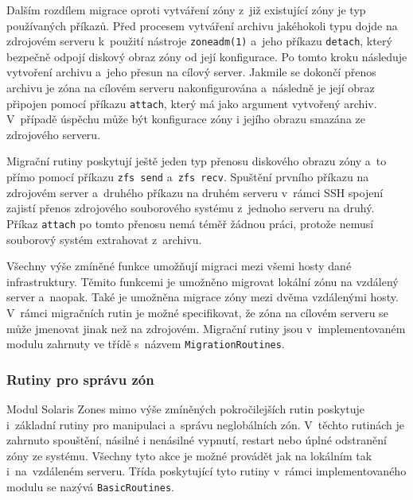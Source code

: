 Dalším rozdílem migrace oproti vytváření zóny z~již existující zóny je typ používaných příkazů. Před procesem vytváření archivu
jakéhokoli typu dojde na zdrojovém serveru
k~použití nástroje \verb|zoneadm(1)| a~jeho příkazu \verb|detach|, který bezpečně odpojí diskový obraz zóny od její konfigurace.
Po tomto kroku následuje vytvoření archivu a~jeho přesun na cílový server. Jakmile se dokončí přenos archivu je zóna na cílovém
serveru nakonfigurována a~následně je její obraz připojen pomocí příkazu \verb|attach|, který má jako argument vytvořený archiv.
V~případě úspěchu může být konfigurace zóny i jejího obrazu smazána ze zdrojového serveru.

Migrační rutiny poskytují ještě jeden typ přenosu diskového obrazu zóny a~to přímo pomocí příkazu \verb|zfs send|
a~\verb|zfs recv|. Spuštění prvního příkazu na zdrojovém server a~druhého příkazu na druhém serveru v~rámci SSH spojení
zajistí přenos zdrojového souborového systému z~jednoho serveru na druhý. Příkaz \verb|attach| po tomto přenosu nemá téměř žádnou práci,
protože nemusí souborový systém extrahovat z~archivu.

Všechny výše zmíněné funkce umožňují migraci mezi všemi hosty dané infrastruktury. Těmito funkcemi je umožněno migrovat 
lokální zónu na vzdálený server a~naopak. Také je umožněna migrace zóny mezi dvěma vzdálenými hosty. V~rámci migračních rutin je
možné specifikovat, že zóna na cílovém serveru se může jmenovat jinak než na zdrojovém. Migrační rutiny jsou v~implementovaném modulu zahrnuty
ve třídě s~názvem \verb|MigrationRoutines|.
\subsubsection{Rutiny pro správu zón}
\label{chapter:implementation:szones:routines:management}
Modul Solaris Zones mimo výše zmíněných pokročilejších rutin poskytuje i~základní rutiny pro manipulaci a~správu 
neglobálních zón. V~těchto rutinách je zahrnuto spouštění, násilné i nenásilné vypnutí, restart nebo úplné odstranění zóny
ze systému. Všechny tyto akce je možné provádět jak na lokálním tak i~na~vzdáleném serveru. Třída poskytující tyto
rutiny v~rámci implementovaného modulu se nazývá \verb|BasicRoutines|.
